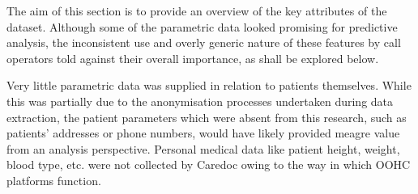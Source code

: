 The aim of this section is to provide an overview of the key attributes of the dataset. Although some of the parametric data looked promising for predictive analysis, the inconsistent use and overly generic nature of these features by call operators told against their overall importance, as shall be explored below.

Very little parametric data was supplied in relation to patients themselves. While this was partially due to the anonymisation processes undertaken during data extraction, the patient parameters which were absent from this research, such as patients' addresses or phone numbers, would have likely provided meagre value from an analysis perspective. Personal medical data like patient height, weight, blood type, etc. were not collected by Caredoc owing to the way in which OOHC platforms function.     
 
 
 
 





